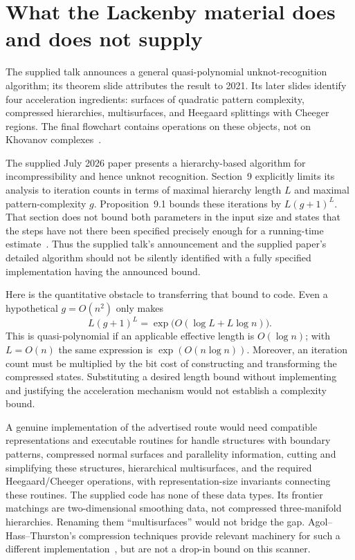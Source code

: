 \documentclass[11pt,letterpaper]{article}
\theoremstyle{definition}\newtheorem{definition}[theorem]{Definition}
\theoremstyle{remark}\newtheorem{remark}[theorem]{Remark}
\newcommand{\code}[1]{\texttt{\detokenize{#1}}}
\begin{document}
\section{What the Lackenby material does and does not supply}

The supplied talk announces a general quasi-polynomial unknot-recognition
algorithm; its theorem slide attributes the result to 2021. Its later slides
identify four acceleration ingredients: surfaces of quadratic pattern
complexity, compressed hierarchies, multisurfaces, and Heegaard splittings with
Cheeger regions. The final flowchart contains operations on these objects, not
on Khovanov complexes~\cite{lacktalk}.

The supplied July 2026 paper presents a hierarchy-based algorithm for
incompressibility and hence unknot recognition. Section~9 explicitly limits its
analysis to iteration counts in terms of maximal hierarchy length $L$ and
maximal pattern-complexity $g$. Proposition~9.1 bounds these iterations by
$L(g+1)^L$. That section does not bound both parameters in the input size and
states that the steps have not there been specified precisely enough for a
running-time estimate~\cite[Section~9]{lackpaper}. Thus the supplied talk's
announcement and the supplied paper's detailed algorithm should not be silently
identified with a fully specified implementation having the announced bound.

Here is the quantitative obstacle to transferring that bound to code. Even a
hypothetical $g=O(n^2)$ only makes
\[
 L(g+1)^L=\exp\!\bigl(O(\log L+L\log n)\bigr).
\]
This is quasi-polynomial if an applicable effective length is $O(\log n)$; with
$L=O(n)$ the same expression is $\exp(O(n\log n))$. Moreover, an iteration count
must be multiplied by the bit cost of constructing and transforming the
compressed states. Substituting a desired length bound without implementing
and justifying the acceleration mechanism would not establish a complexity
bound.

A genuine implementation of the advertised route would need compatible
representations and executable routines for handle structures with boundary
patterns, compressed normal surfaces and parallelity information, cutting and
simplifying these structures, hierarchical multisurfaces, and the required
Heegaard/Cheeger operations, with representation-size invariants connecting
these routines. The supplied \code{fast/} code has none of these data types.
Its frontier matchings are two-dimensional smoothing data, not compressed
three-manifold hierarchies. Renaming them ``multisurfaces'' would not bridge the
gap. Agol--Hass--Thurston's compression techniques provide relevant machinery
for such a different implementation~\cite{aht}, but are not a drop-in bound on
this scanner.
\end{document}

